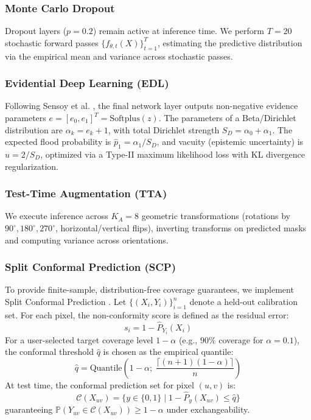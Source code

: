 \documentclass[journal]{IEEEtran}
\begin{document}
\subsubsection{Monte Carlo Dropout}
Dropout layers ($p = 0.2$) remain active at inference time. We perform $T = 20$ stochastic forward passes $\{f_{\theta, t}(X)\}_{t=1}^T$, estimating the predictive distribution via the empirical mean and variance across stochastic passes.

\subsubsection{Evidential Deep Learning (EDL)}
Following Sensoy et al. \cite{sensoy2018}, the final network layer outputs non-negative evidence parameters $e = [e_0, e_1]^T = \text{Softplus}(z)$. The parameters of a Beta/Dirichlet distribution are $\alpha_k = e_k + 1$, with total Dirichlet strength $S_D = \alpha_0 + \alpha_1$. The expected flood probability is $\hat{p}_1 = \alpha_1 / S_D$, and vacuity (epistemic uncertainty) is $u = 2 / S_D$, optimized via a Type-II maximum likelihood loss with KL divergence regularization.

\subsubsection{Test-Time Augmentation (TTA)}
We execute inference across $K_A = 8$ geometric transformations (rotations by $90^\circ, 180^\circ, 270^\circ$, horizontal/vertical flips), inverting transforms on predicted masks and computing variance across orientations.

\subsubsection{Split Conformal Prediction (SCP)}
To provide finite-sample, distribution-free coverage guarantees, we implement Split Conformal Prediction \cite{angelopoulos2021}. Let $\{(X_i, Y_i)\}_{i=1}^n$ denote a held-out calibration set. For each pixel, the non-conformity score is defined as the residual error:
\begin{equation}
s_i = 1 - \hat{P}_{Y_i}(X_i)
\end{equation}
For a user-selected target coverage level $1 - \alpha$ (e.g., $90\%$ coverage for $\alpha = 0.1$), the conformal threshold $\hat{q}$ is chosen as the empirical quantile:
\begin{equation}
\hat{q} = \text{Quantile}\left(1 - \alpha; \; \frac{\lceil (n+1)(1-\alpha) \rceil}{n}\right)
\end{equation}
At test time, the conformal prediction set for pixel $(u,v)$ is:
\begin{equation}
\mathcal{C}(X_{uv}) = \{y \in \{0, 1\} \mid 1 - \hat{P}_y(X_{uv}) \le \hat{q}\}
\end{equation}
guaranteeing $\mathbb{P}(Y_{uv} \in \mathcal{C}(X_{uv})) \ge 1 - \alpha$ under exchangeability.
\end{document}
